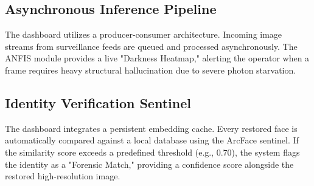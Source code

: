 \subsection{Asynchronous Inference Pipeline}
The dashboard utilizes a producer-consumer architecture. Incoming image streams from surveillance feeds are queued and processed asynchronously. The ANFIS module provides a live "Darkness Heatmap," alerting the operator when a frame requires heavy structural hallucination due to severe photon starvation.

\subsection{Identity Verification Sentinel}
The dashboard integrates a persistent embedding cache. Every restored face is automatically compared against a local database using the ArcFace sentinel. If the similarity score exceeds a predefined threshold (e.g., 0.70), the system flags the identity as a "Forensic Match," providing a confidence score alongside the restored high-resolution image.
